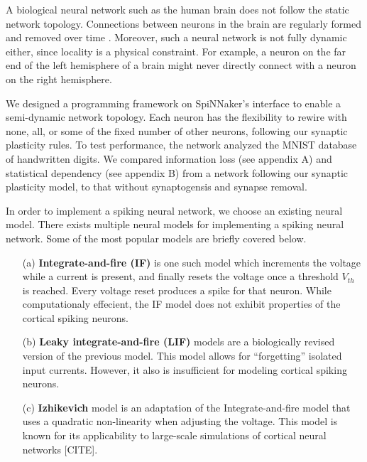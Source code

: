 \documentclass[journal]{./sty/IEEEtran}
\begin{document}
A biological neural network such as the human brain does not follow the static network topology. 
Connections between neurons in the brain are regularly formed and removed over time \cite{SynGen:Levy, StatDepRed:Levy}. 
Moreover, such a neural network is not fully dynamic either, since locality is a physical constraint. 
For example, a neuron on the far end of the left hemisphere of a brain might never directly connect with a neuron on the right hemisphere.

We designed a programming framework on SpiNNaker's interface to enable a semi-dynamic network topology.
Each neuron has the flexibility to rewire with none, all, or some of the fixed number of other neurons, following our synaptic plasticity rules.
To test performance, the network analyzed the MNIST database of handwritten digits. We compared information loss (see appendix A) and statistical dependency (see appendix B) from a network following our synaptic plasticity model, to that without synaptogensis and synapse removal.


In order to implement a spiking neural network, we choose an existing neural model.
There exists multiple neural models for implementing a spiking neural network. 
Some of the most popular models are briefly covered below.
 
\begin{itemize}
\item[(a)] {\bf Integrate-and-fire (IF)} 
 is one such model which increments the voltage while a current is present,
and finally resets the voltage once a threshold $V_{th}$ is reached. 
Every voltage reset produces a spike for that neuron.
While computationaly effecient, the IF model does not exhibit properties of the cortical spiking neurons.
\item[(b)] {\bf Leaky integrate-and-fire (LIF)} 
 models are a biologically revised version of the previous model.
This model allows for ``forgetting'' isolated input currents.
However, it also is insufficient for modeling cortical spiking neurons.
\item[(c)] {\bf Izhikevich} 
 model is an adaptation of the Integrate-and-fire model that uses a quadratic non-linearity when adjusting the voltage.
This model is known for its applicability to large-scale simulations of cortical neural networks [CITE].
\end{itemize}
\end{document}
